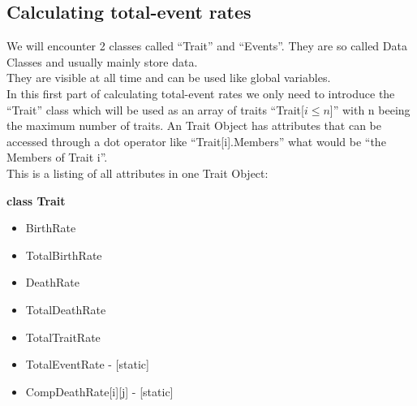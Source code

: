 \documentclass{article}
\begin{document}
\subsection{Calculating total-event rates}
We will encounter 2 classes called "`Trait"' and "`Events"'. They are so called Data Classes and usually mainly store data.\\
They are visible at all time and can be used like global variables. \\
In this first part of calculating total-event rates we only need to introduce the "`Trait"' class which will be used as an array of traits "`Trait[$i\le n$]"' with n beeing the maximum number of traits. An Trait Object has attributes that can be accessed through a dot operator like "`Trait[i].Members"' what would be "`the Members of Trait i"'.\\
This is a listing of all attributes in one Trait Object:\\
\textcolor[rgb]{0,0,0.55}{\textbf{class Trait}
\begin{itemize}
	\item BirthRate
	\item TotalBirthRate
	\item DeathRate
	\item TotalDeathRate
	\item TotalTraitRate
	\item TotalEventRate - [static]
	\item CompDeathRate[i][j] - [static]
\end{itemize}
}
\end{document}
